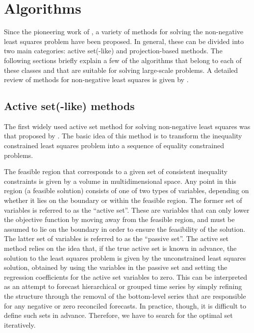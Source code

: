 \documentclass[11pt]{article}
\newcommand{\0}{\phantom{0}}
\begin{document}
\section{Algorithms}\label{sec:quadalgo}

Since the pioneering work of \citet{Lawson1974}, a variety of methods for solving the non-negative least squares problem have been proposed. In general, these can be divided into two main categories: active set(-like) and projection-based methods. The following sections briefly explain a few of the algorithms that belong to each of these classes and that are suitable for solving large-scale problems. A detailed review of methods for non-negative least squares is given by \citet{Chen2009}.

\subsection{Active set(-like) methods}

The first widely used active set method for solving non-negative least squares was that proposed by \citet{Lawson1974}. The basic idea of this method is to transform the inequality constrained least squares problem into a sequence of equality constrained problems. 

The feasible region that corresponds to a given set of consistent inequality constraints is given by a volume in multidimensional space. Any point in this region (a feasible solution) consists of one of two types of variables, depending on whether it lies on the boundary or within the feasible region. The former set of variables is referred to as the ``active set''. These are variables that can only lower the objective function by moving away from the feasible region, and must be assumed to lie on the boundary in order to ensure the feasibility of the solution. The latter set of variables is referred to as the ``passive set''. The active set method relies on the idea that, if the true active set is known in advance, the solution to the least squares problem is given by the unconstrained least squares solution, obtained by using the variables in the passive set and setting the regression coefficients for the active set variables to zero. This can be interpreted as an attempt to forecast hierarchical or grouped time series by simply refining the structure through the removal of the bottom-level series that are responsible for any negative or zero reconciled forecasts. In practice, though, it is difficult to define such sets in advance. Therefore, we have to search for the optimal set iteratively. 
\end{document}
